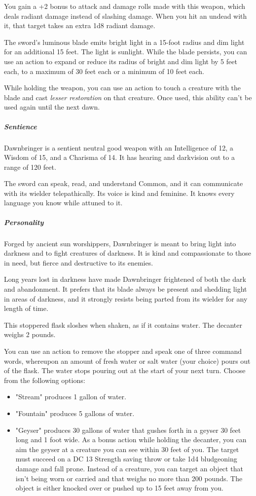 \documentclass[10pt,a4paper,twoside,bg=print,twocolumn,openany,nodeprecatedcode]{dndbook}
\begin{document}
You gain a +2 bonus to attack and damage rolls made with this weapon, which deals radiant damage instead of slashing damage. When you hit an undead with it, that target takes an extra 1d8 radiant damage.

The sword's luminous blade emits bright light in a 15-foot radius and dim light for an additional 15 feet. The light is sunlight. While the blade persists, you can use an action to expand or reduce its radius of bright and dim light by 5 feet each, to a maximum of 30 feet each or a minimum of 10 feet each.

While holding the weapon, you can use an action to touch a creature with the blade and cast \textit{lesser restoration} on that creature. Once used, this ability can't be used again until the next dawn.

\subparagraph{Sentience}
Dawnbringer is a sentient neutral good weapon with an Intelligence of 12, a Wisdom of 15, and a Charisma of 14. It has hearing and darkvision out to a range of 120 feet.

The sword can speak, read, and understand Common, and it can communicate with its wielder telepathically. Its voice is kind and feminine. It knows every language you know while attuned to it.

\subparagraph{Personality}
Forged by ancient sun worshippers, Dawnbringer is meant to bring light into darkness and to fight creatures of darkness. It is kind and compassionate to those in need, but fierce and destructive to its enemies.

Long years lost in darkness have made Dawnbringer frightened of both the dark and abandonment. It prefers that its blade always be present and shedding light in areas of darkness, and it strongly resists being parted from its wielder for any length of time.

This stoppered flask sloshes when shaken, as if it contains water. The decanter weighs 2 pounds.

You can use an action to remove the stopper and speak one of three command words, whereupon an amount of fresh water or salt water (your choice) pours out of the flask. The water stops pouring out at the start of your next turn. Choose from the following options:


\begin{itemize}
\item "Stream" produces 1 gallon of water.
\item "Fountain" produces 5 gallons of water.
\item "Geyser" produces 30 gallons of water that gushes forth in a geyser 30 feet long and 1 foot wide. As a bonus action while holding the decanter, you can aim the geyser at a creature you can see within 30 feet of you. The target must succeed on a DC 13 Strength saving throw or take 1d4 bludgeoning damage and fall prone. Instead of a creature, you can target an object that isn't being worn or carried and that weighs no more than 200 pounds. The object is either knocked over or pushed up to 15 feet away from you.
\end{itemize}
\end{document}
